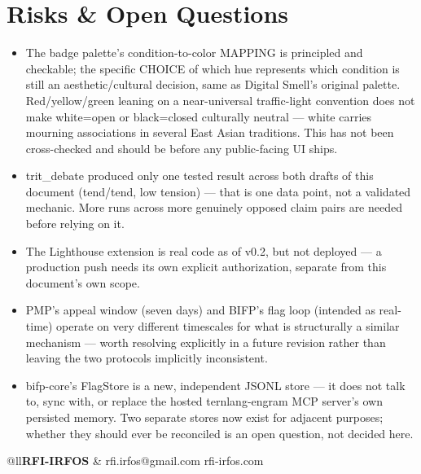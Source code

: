 \documentclass[11pt,a4paper]{article}
\begin{document}
\section{Risks \& Open Questions}
\begin{itemize}[leftmargin=14pt, itemsep=2pt]
  \item The badge palette's condition-to-color MAPPING is principled and checkable; the specific CHOICE of which hue represents which condition is still an aesthetic/cultural decision, same as Digital Smell's original palette. Red/yellow/green leaning on a near-universal traffic-light convention does not make white=open or black=closed culturally neutral — white carries mourning associations in several East Asian traditions. This has not been cross-checked and should be before any public-facing UI ships.
  \item trit\_debate produced only one tested result across both drafts of this document (tend/tend, low tension) — that is one data point, not a validated mechanic. More runs across more genuinely opposed claim pairs are needed before relying on it.
  \item The Lighthouse extension is real code as of v0.2, but not deployed — a production push needs its own explicit authorization, separate from this document's own scope.
  \item PMP's appeal window (seven days) and BIFP's flag loop (intended as real-time) operate on very different timescales for what is structurally a similar mechanism — worth resolving explicitly in a future revision rather than leaving the two protocols implicitly inconsistent.
  \item bifp-core's FlagStore is a new, independent JSONL store — it does not talk to, sync with, or replace the hosted ternlang-engram MCP server's own persisted memory. Two separate stores now exist for adjacent purposes; whether they should ever be reconciled is an open question, not decided here.
\end{itemize}

\vspace{10pt}{\color{rfi-gray!55}\hrule}\vspace{8pt}
\begin{tabular}{@{}ll}\textbf{\color{rfi-white}RFI-IRFOS} & \color{rfi-text}rfi.irfos@gmail.com \textbullet{} rfi-irfos.com \\\end{tabular}
\end{document}
